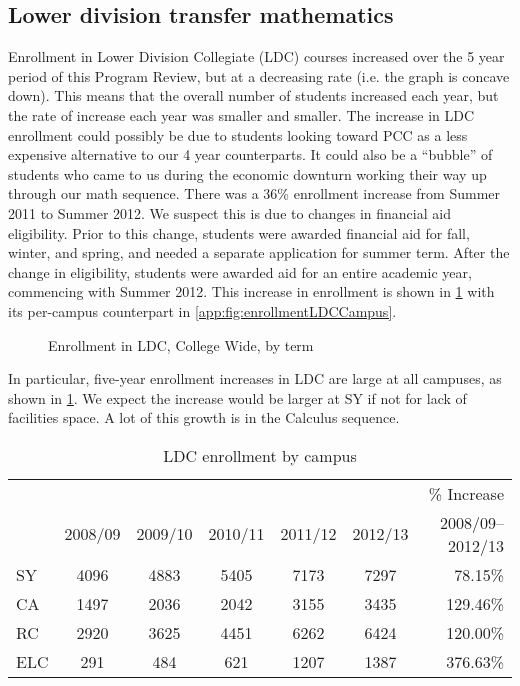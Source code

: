 \subsection{Lower division transfer mathematics}
Enrollment in Lower Division Collegiate (LDC) courses increased over the 5
year period of this Program Review, but at a decreasing rate (i.e. the graph is concave down). This means that the overall number of students increased each year, but the rate of increase each year was smaller and smaller. The increase in LDC enrollment could possibly be due to students looking toward PCC as a less expensive alternative to our 4 year counterparts. It could also be a ``bubble'' of students who came to us during the economic downturn working their way up through our math sequence.  There was a 36\% enrollment increase from Summer 2011 to Summer 2012. We suspect this is due to
changes in financial aid eligibility. Prior to this change, students were
awarded financial aid for fall, winter, and spring, and needed a separate
application for summer term.  After the change in eligibility, students were
awarded aid for an entire academic year, commencing with Summer 2012.
This increase in enrollment is shown in \cref{needs:fig:enrollmentLDCTerm} with
its per-campus counterpart in \vref{app:fig:enrollmentLDCCampus}.


\begin{figure}[!htb]
	\centering
	
	\caption{Enrollment in LDC, College Wide, by term}
	\label{needs:fig:enrollmentLDCTerm}
\end{figure}

In particular, five-year enrollment increases  in LDC are large at all
campuses, as shown in \cref{needs:tab:LDCenrollmentCampus}.  We expect the
increase would be larger at SY if not for lack of facilities space. A lot of
this growth is in the Calculus sequence.

\begin{table}[!htb]
	\centering
	\caption{LDC enrollment by campus}
	\label{needs:tab:LDCenrollmentCampus}
	\begin{tabular}{l*{5}{c}r}
		\toprule
		    &        &        &        &        &        & \% Increase \\
		    & 2008/09 & 2009/10 & 2010/11 & 2011/12 & 2012/13 & 2008/09--2012/13   \\
		\midrule
		SY  & 4096   & 4883   & 5405   & 7173   & 7297   & 78.15\%     \\
		CA  & 1497   & 2036   & 2042   & 3155   & 3435   & 129.46\%    \\
		RC  & 2920   & 3625   & 4451   & 6262   & 6424   & 120.00\%    \\
		ELC & 291    & 484    & 621    & 1207   & 1387   & 376.63\%    \\
		\bottomrule
	\end{tabular}
\end{table}


